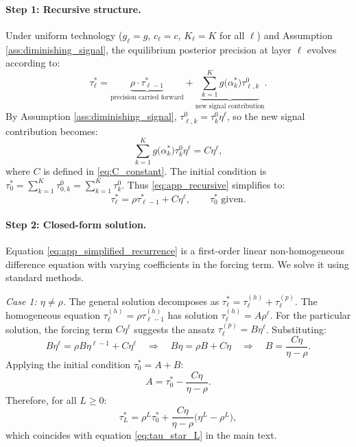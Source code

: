 \paragraph{Step 1: Recursive structure.}
Under uniform technology ($g_{\ell} = g$, $c_{\ell} = c$, $K_{\ell} = K$ for all $\ell$) and Assumption \ref{ass:diminishing_signal}, the equilibrium posterior precision at layer $\ell$ evolves according to:
\begin{equation}\label{eq:app_recursive}
\tau^{*}_{\ell} = \underbrace{\rho \cdot \tau^{*}_{\ell-1}}_{\text{precision carried forward}} + \underbrace{\sum_{k=1}^{K} g\bigl(\alpha^{*}_{k}\bigr) \tau^{0}_{\ell,k}}_{\text{new signal contribution}}.
\end{equation}
By Assumption \ref{ass:diminishing_signal}, $\tau^{0}_{\ell,k} = \tau^{0}_{k} \eta^{\ell}$, so the new signal contribution becomes:
\begin{equation}\label{eq:app_C_def}
\sum_{k=1}^{K} g\bigl(\alpha^{*}_{k}\bigr) \tau^{0}_{k} \eta^{\ell} = C \eta^{\ell},
\end{equation}
where $C$ is defined in \eqref{eq:C_constant}. The initial condition is $\tau^{*}_{0} = \sum_{k=1}^{K} \tau^{0}_{0,k} = \sum_{k=1}^{K} \tau^{0}_{k}$. Thus \eqref{eq:app_recursive} simplifies to:
\begin{equation}\label{eq:app_simplified_recurrence}
\tau^{*}_{\ell} = \rho \tau^{*}_{\ell-1} + C \eta^{\ell}, \qquad \tau^{*}_{0} \text{ given}.
\end{equation}

\paragraph{Step 2: Closed-form solution.}
Equation \eqref{eq:app_simplified_recurrence} is a first-order linear non-homogeneous difference equation with varying coefficients in the forcing term. We solve it using standard methods.

\textit{Case 1: $\eta \neq \rho$.} The general solution decomposes as $\tau^{*}_{\ell} = \tau^{(h)}_{\ell} + \tau^{(p)}_{\ell}$. The homogeneous equation $\tau^{(h)}_{\ell} = \rho \tau^{(h)}_{\ell-1}$ has solution $\tau^{(h)}_{\ell} = A \rho^{\ell}$. For the particular solution, the forcing term $C\eta^{\ell}$ suggests the ansatz $\tau^{(p)}_{\ell} = B \eta^{\ell}$. Substituting:
\begin{equation*}
B\eta^{\ell} = \rho B \eta^{\ell-1} + C\eta^{\ell}
\quad\Longrightarrow\quad
B\eta = \rho B + C\eta
\quad\Longrightarrow\quad
B = \frac{C\eta}{\eta - \rho}.
\end{equation*}
Applying the initial condition $\tau^{*}_{0} = A + B$:
\begin{equation}
A = \tau^{*}_{0} - \frac{C\eta}{\eta - \rho}.
\end{equation}
Therefore, for all $L \geq 0$:
\begin{equation}\label{eq:app_closed_form}
\tau^{*}_{L} = \rho^{L}\tau^{*}_{0} + \frac{C\eta}{\eta - \rho}\bigl(\eta^{L} - \rho^{L}\bigr),
\end{equation}
which coincides with equation \eqref{eq:tau_star_L} in the main text.


